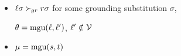 
\begin{itemize}

        \item
            $\ell\sigma\mathrel\succ_{\!gr} r\sigma$ for some grounding substitution $\sigma$,

            $\theta=\operatorname{mgu}(\ell,\ell')$,
            $\ell'\notin\mathcal{V}$

        \item
            $\mu=\operatorname{mgu}(s,t)$
    \end{itemize}